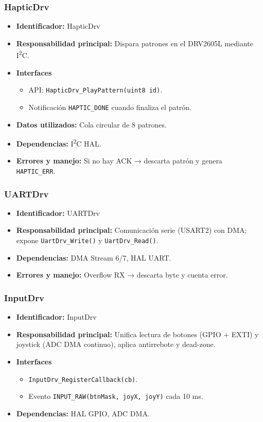 \documentclass[11pt,a4paper]{article}
\begin{document}
\subsubsection{HapticDrv}
\begin{itemize}
  \item \textbf{Identificador:} HapticDrv
  \item \textbf{Responsabilidad principal:} Dispara patrones en el DRV2605L mediante I\textsuperscript{2}C.
  \item \textbf{Interfaces} 
    \begin{itemize}
      \item API: \texttt{HapticDrv\_PlayPattern(uint8 id)}.
      \item Notificación \texttt{HAPTIC\_DONE} cuando finaliza el patrón.
    \end{itemize}
  \item \textbf{Datos utilizados:} Cola circular de 8 patrones.
  \item \textbf{Dependencias:} I\textsuperscript{2}C HAL.
  \item \textbf{Errores y manejo:} Si no hay ACK → descarta patrón y genera \texttt{HAPTIC\_ERR}.
\end{itemize}

\subsubsection{UARTDrv}
\begin{itemize}
  \item \textbf{Identificador:} UARTDrv
  \item \textbf{Responsabilidad principal:} Comunicación serie (USART2) con DMA; expone \texttt{UartDrv\_Write()} y \texttt{UartDrv\_Read()}.
  \item \textbf{Dependencias:} DMA Stream 6/7, HAL UART.
  \item \textbf{Errores y manejo:} Overflow RX → descarta byte y cuenta error.
\end{itemize}

\subsubsection{InputDrv}
\begin{itemize}
  \item \textbf{Identificador:} InputDrv
  \item \textbf{Responsabilidad principal:} Unifica lectura de botones (GPIO + EXTI) y joystick (ADC DMA continuo), aplica antirrebote y dead-zone.
  \item \textbf{Interfaces}
    \begin{itemize}
      \item \texttt{InputDrv\_RegisterCallback(cb)}.
      \item Evento \texttt{INPUT\_RAW(btnMask, joyX, joyY)} cada 10 ms.
    \end{itemize}
  \item \textbf{Dependencias:} HAL GPIO, ADC DMA.
\end{itemize}
\end{document}

